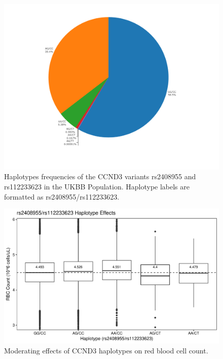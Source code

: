 \documentclass{article}\usepackage[]{graphicx}\usepackage[]{color}
\makeatletter
\def\maxwidth{ %
  \ifdim\Gin@nat@width>\linewidth
    \linewidth
  \else
    \Gin@nat@width
  \fi
}
\newenvironment{knitrout}{}{} %
\makeatother
\begin{document}
\begin{figure}
\centering
\includegraphics[width=\linewidth]{staticFigures/rs9349205_rs112233623_conditional_piechart.pdf}
\caption{Haplotypes frequencies of the CCND3 variants rs2408955 and rs112233623 in the UKBB Population. Haplotype labels are formatted as rs2408955/rs112233623.}
\end{figure}

\begin{knitrout}
\color{fgcolor}\begin{figure}[H]

{\centering \includegraphics[width=\maxwidth]{figure/ccnd3Boxplots-1} 

}

\caption[Moderating effects of CCND3 haplotypes on red blood cell count]{Moderating effects of CCND3 haplotypes on red blood cell count.}\label{fig:ccnd3Boxplots}
\end{figure}


\end{knitrout}
\end{document}

